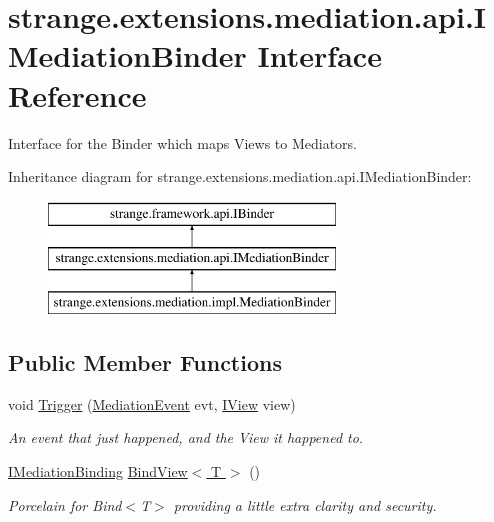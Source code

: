 \hypertarget{interfacestrange_1_1extensions_1_1mediation_1_1api_1_1_i_mediation_binder}{\section{strange.\-extensions.\-mediation.\-api.\-I\-Mediation\-Binder Interface Reference}
\label{interfacestrange_1_1extensions_1_1mediation_1_1api_1_1_i_mediation_binder}
}


Interface for the Binder which maps Views to Mediators.  


Inheritance diagram for strange.\-extensions.\-mediation.\-api.\-I\-Mediation\-Binder\-:\begin{figure}[H]
\begin{center}
\leavevmode
\includegraphics[height=3.000000cm]{interfacestrange_1_1extensions_1_1mediation_1_1api_1_1_i_mediation_binder}
\end{center}
\end{figure}
\subsection*{Public Member Functions}
\begin{DoxyCompactItemize}
\item 
void \hyperlink{interfacestrange_1_1extensions_1_1mediation_1_1api_1_1_i_mediation_binder_a7e394e1dbd3279239425740221f727c7}{Trigger} (\hyperlink{namespacestrange_1_1extensions_1_1mediation_1_1api_ae5a81bb1edf9fca1d2aca9f4fada72a8}{Mediation\-Event} evt, \hyperlink{interfacestrange_1_1extensions_1_1mediation_1_1api_1_1_i_view}{I\-View} view)
\begin{DoxyCompactList}\small\item\em An event that just happened, and the View it happened to. \end{DoxyCompactList}\item 
\hypertarget{interfacestrange_1_1extensions_1_1mediation_1_1api_1_1_i_mediation_binder_a0e06538abe8fb83adaa0cf2c880cb52f}{\hyperlink{interfacestrange_1_1extensions_1_1mediation_1_1api_1_1_i_mediation_binding}{I\-Mediation\-Binding} \hyperlink{interfacestrange_1_1extensions_1_1mediation_1_1api_1_1_i_mediation_binder_a0e06538abe8fb83adaa0cf2c880cb52f}{Bind\-View$<$ T $>$} ()}\label{interfacestrange_1_1extensions_1_1mediation_1_1api_1_1_i_mediation_binder_a0e06538abe8fb83adaa0cf2c880cb52f}

\begin{DoxyCompactList}\small\item\em Porcelain for Bind$<$\-T$>$ providing a little extra clarity and security. \end{DoxyCompactList}\end{DoxyCompactItemize}


